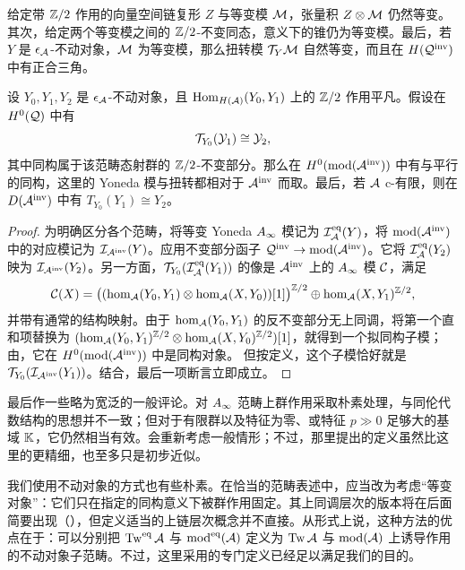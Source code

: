 给定带 $\mathbb Z/2$ 作用的向量空间链复形 $Z$ 与等变模 $\mathcal M$，张量积 $Z\otimes\mathcal M$ 仍然等变。其次，给定两个等变模之间的 $\mathbb Z/2$-不变同态，意义下的锥仍为等变模。最后，若 $Y$ 是 $\epsilon_{\mathcal A}$-不动对象，$\mathcal M$ 为等变模，那么扭转模 $\mathcal T_Y\mathcal M$ 自然等变，而且在 $H(\mathcal Q^{\mathrm{inv}})$ 中有正合三角。
\begin{lemma}\label{st:6.4}
设 $Y_0,Y_1,Y_2$ 是 $\epsilon_{\mathcal A}$-不动对象，且 $\operatorname{Hom}_{H(\mathcal A)}(Y_0,Y_1)$ 上的 $\mathbb Z/2$ 作用平凡。假设在 $H^0(\mathcal Q)$ 中有
\begin{equation}\label{eq:6.5}
\mathcal T_{Y_0}(\mathcal Y_1)\cong\mathcal Y_2,
\end{equation}
其中同构属于该范畴态射群的 $\mathbb Z/2$-不变部分。那么在 $H^0(\operatorname{mod}(\mathcal A^{\mathrm{inv}}))$ 中有与平行的同构，这里的 Yoneda 模与扭转都相对于 $\mathcal A^{\mathrm{inv}}$ 而取。最后，若 $\mathcal A$ c-有限，则在 $D(\mathcal A^{\mathrm{inv}})$ 中有 $T_{Y_0}(Y_1)\cong Y_2$。
\end{lemma}
\begin{proof}
为明确区分各个范畴，将等变 Yoneda $A_\infty$ 模记为 $\mathcal I_{\mathcal A}^{\mathrm{eq}}(Y)$，将 $\operatorname{mod}(\mathcal A^{\mathrm{inv}})$ 中的对应模记为 $\mathcal I_{\mathcal A^{\mathrm{inv}}}(Y)$。应用不变部分函子 $\mathcal Q^{\mathrm{inv}}\to\operatorname{mod}(\mathcal A^{\mathrm{inv}})$。它将 $\mathcal I_{\mathcal A}^{\mathrm{eq}}(Y_2)$ 映为 $\mathcal I_{\mathcal A^{\mathrm{inv}}}(Y_2)$。另一方面，$\mathcal T_{Y_0}(\mathcal I_{\mathcal A}^{\mathrm{eq}}(Y_1))$ 的像是 $\mathcal A^{\mathrm{inv}}$ 上的 $A_\infty$ 模 $\mathcal C$，满足
\[
\mathcal C(X)=\bigl((\hom_{\mathcal A}(Y_0,Y_1)\otimes\hom_{\mathcal A}(X,Y_0))[1]\bigr)^{\mathbb Z/2}\oplus\hom_{\mathcal A}(X,Y_1)^{\mathbb Z/2},
\]
并带有通常的结构映射。由于 $\hom_{\mathcal A}(Y_0,Y_1)$ 的反不变部分无上同调，将第一个直和项替换为 $(\hom_{\mathcal A}(Y_0,Y_1)^{\mathbb Z/2}\otimes\hom_{\mathcal A}(X,Y_0)^{\mathbb Z/2})[1]$，就得到一个拟同构子模；由，它在 $H^0(\operatorname{mod}(\mathcal A^{\mathrm{inv}}))$ 中是同构对象。
但按定义，这个子模恰好就是 $\mathcal T_{Y_0}(\mathcal I_{\mathcal A^{\mathrm{inv}}}(Y_1))$。结合，最后一项断言立即成立。
\end{proof}
\begin{note}\label{st:6.5}
最后作一些略为宽泛的一般评论。对 $A_\infty$ 范畴上群作用采取朴素处理，与同伦代数结构的思想并不一致；但对于有限群以及特征为零、或特征 $p\gg0$ 足够大的基域 $\mathbb K$，它仍然相当有效。会重新考虑一般情形；不过，那里提出的定义虽然比这里的更精细，也至多只是初步近似。

我们使用不动对象的方式也有些朴素。在恰当的范畴表述中，应当改为考虑“等变对象”：它们只在指定的同构意义下被群作用固定。其上同调层次的版本将在后面简要出现（），但定义适当的上链层次概念并不直接。从形式上说，这种方法的优点在于：可以分别把 $\operatorname{Tw}^{\mathrm{eq}}\mathcal A$ 与 $\operatorname{mod}^{\mathrm{eq}}(\mathcal A)$ 定义为 $\operatorname{Tw}\mathcal A$ 与 $\operatorname{mod}(\mathcal A)$ 上诱导作用的不动对象子范畴。不过，这里采用的专门定义已经足以满足我们的目的。
\end{note}
